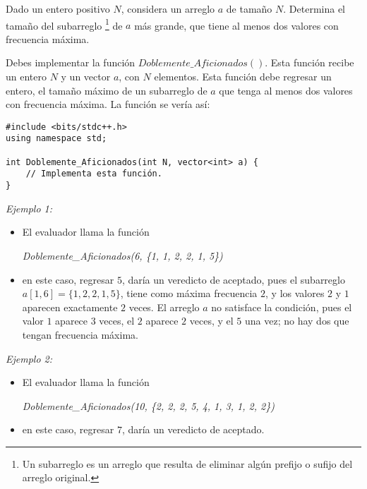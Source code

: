 \documentclass[12pt]{scrartcl}
\begin{document}
    
    
    \vspace{10pt}

    
    
        Dado un entero positivo $N$, considera un arreglo $a$ de tamaño $N$. Determina el tamaño del subarreglo \footnote{Un subarreglo es un arreglo que resulta de eliminar algún prefijo o sufijo del arreglo original.} de $a$ más grande, que tiene al menos dos valores con frecuencia máxima. 
    

       Debes implementar la función $Doblemente\_Aficionados()$. Esta función recibe un entero $N$ y un vector $a$, con $N$ elementos. Esta función debe regresar un entero, el tamaño máximo de un subarreglo de $a$ que tenga al menos dos valores con frecuencia máxima.
        La función se vería así:

\begin{verbatim}
#include <bits/stdc++.h>
using namespace std;

int Doblemente_Aficionados(int N, vector<int> a) {
    // Implementa esta función.
}
\end{verbatim}

    
        {\itshape Ejemplo 1:}
        \begin{itemize}
            \item El evaluador llama la función 

            \begin{center}
                {\itshape Doblemente\_Aficionados(6, \{1, 1, 2, 2, 1, 5\})}
            \end{center}
            
            \item en este caso, regresar $5$, daría un veredicto de aceptado, pues el subarreglo $a[1, 6] = \{1, 2, 2, 1, 5\}$, tiene como máxima frecuencia $2$, y los valores $2$ y $1$ aparecen exactamente $2$ veces. El arreglo $a$ no satisface la condición, pues el valor $1$ aparece $3$ veces, el $2$ aparece $2$ veces, y el $5$ una vez; no hay dos que tengan frecuencia máxima. 
        \end{itemize}
        
        {\itshape Ejemplo 2:}
        \begin{itemize}
            \item El evaluador llama la función 
            
            \begin{center}
                {\itshape Doblemente\_Aficionados(10, \{2, 2, 2, 5, 4, 1, 3, 1, 2, 2\})}
            \end{center}

            \item en este caso, regresar $7$, daría un veredicto de aceptado.
        \end{itemize}
        
\end{document}
